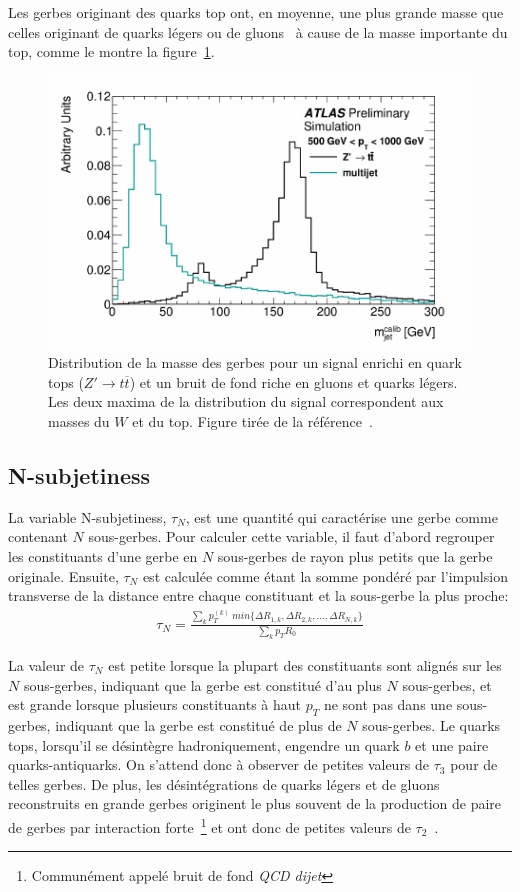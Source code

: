 Les gerbes originant des quarks top ont, en moyenne, une plus grande
masse que celles originant de quarks légers ou de
gluons~\cite{_boosted_2015} à cause de la masse importante du top, comme le montre la
figure~\ref{fig:mass_distr}.

\begin{figure}
  \centering
  \includegraphics[width=.5\textwidth]{mass_distr.pdf}
  \caption{Distribution de la masse des gerbes pour un
    signal enrichi en quark tops ($Z' \rightarrow t\overline{t}$) et
    un bruit de fond riche en gluons et quarks légers. Les deux maxima
    de la distribution du signal correspondent aux masses du $W$ et du
    top. Figure tirée de la référence~\cite{_boosted_2015}.}
  \label{fig:mass_distr}
\end{figure}


\subsection{N-subjetiness}
\label{sec:top:sous_structure:tau_ij}

La variable N-subjetiness, $\tau_N$, est une quantité qui caractérise
une gerbe comme contenant $N$ sous-gerbes. Pour calculer cette
variable, il faut d'abord regrouper les constituants d'une gerbe en
$N$ sous-gerbes de rayon plus petits que la gerbe originale. Ensuite,
$\tau_N$ est calculée comme étant la somme pondéré par l'impulsion
transverse de la distance entre chaque constituant et la sous-gerbe la plus proche:
\begin{eqnarray}
  \tau_N = \frac{\sum_kp_T^{(k)}\ min\{\Delta R_{1,k},\Delta R_{2,k},\ldots,\Delta R_{N,k}\}}{\sum_kp_TR_0}
\end{eqnarray}

La valeur de $\tau_N$ est petite lorsque la plupart des constituants
sont alignés sur les $N$ sous-gerbes, indiquant que la gerbe est
constitué d'au plus $N$ sous-gerbes, et est grande lorsque plusieurs
constituants à haut $p_T$ ne sont pas dans une sous-gerbes, indiquant
que la gerbe est constitué de plus de $N$ sous-gerbes. Le quarks tops,
lorsqu'il se désintègre hadroniquement, engendre un quark $b$ et une
paire quarks-antiquarks. On s'attend donc à observer de petites
valeurs de $\tau_3$ pour de telles gerbes. De plus, les
désintégrations de quarks légers et de gluons reconstruits en grande
gerbes originent le plus souvent de la production de paire de gerbes
par interaction forte~\footnote{Communément appelé bruit de fond
  \emph{QCD dijet}} et ont donc de petites valeurs de
$\tau_2$~\cite{thaler_identifying_2011}.

